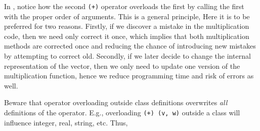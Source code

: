 In , notice how the second \lstinline{(+)} operator overloads the first by calling the first with the proper order of arguments. This is a general principle,  Here it is to be preferred for two reasons. Firstly, if we discover a mistake in the multiplication code, then we need only correct it once, which implies that both multiplication methods are corrected once and reducing the chance of introducing new mistakes by attempting to correct old. Secondly, if we later decide to change the internal representation of the vector, then we only need to update one version of the multiplication function, hence we reduce programming time and risk of errors as well.

Beware that operator overloading outside class definitions overwrites \emph{all} definitions of the operator. E.g., overloading \lstinline{(+) (v, w)} outside a class will influence integer, real, string, etc. Thus, 


